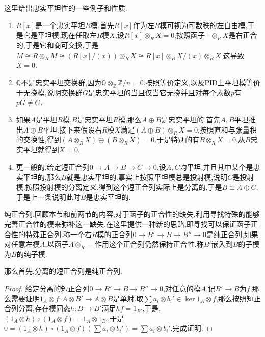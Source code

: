 这里给出忠实平坦性的一些例子和性质.
\begin{enumerate}
	\item $R[x]$是一个忠实平坦$R$模.首先$R[x]$作为左$R$模可视为可数秩的左自由模,于是它是平坦模.现在任取左$R$模$X$,设$R[x]\otimes_RX=0$.按照函子$-\otimes_RX$是右正合的,于是它和商可交换,于是$M\cong R\otimes_RM\cong(R[x]/(x))\otimes_RX\cong R[x]\otimes_RX/(x)\otimes_RX$.这导致$X=0$.
	\item $\mathbb{Q}$不是忠实平坦交换群,因为$\mathbb{Q}\otimes_{\mathbb{Z}}\mathbb{Z}/n=0$.按照等价定义,以及PID上平坦模等价于无挠模,说明交换群$G$是忠实平坦的当且仅当它无挠并且对每个素数$p$有$pG\not=G$.
	\item 如果$A$是平坦$R$模,$B$是忠实平坦$R$模,那么$A\oplus B$是忠实平坦的.首先$A,B$平坦推出$A\oplus B$平坦.接下来假设右$R$模$X$满足$(A\oplus B)\otimes_RX=0$,按照直和与张量积的交换性,得到$(A\otimes_RX)\oplus(B\otimes_RX)=0$.于是特别的有$B\otimes_RX=0$,从$B$忠实平坦就得到$X=0$.
	\item 更一般的,给定短正合列$0\to A\to B\to C\to0$,设$A,C$均平坦,并且其中某个是忠实平坦的,那么$B$就是忠实平坦的.事实上按照平坦模总是投射模,说明$C$是投射模.按照投射模的分离定义,得到这个短正合列实际上是分离的,于是$B\cong A\oplus C$,于是上一条说明此时$B$是忠实平坦的.
\end{enumerate}

纯正合列.回顾本节和前两节的内容,对于函子的正合性的缺失,利用寻找特殊的能够完善正合性的模来弥补这一缺失.在这里提供一种新的思路,即寻找可以保证函子正合性的特殊正合列.称一个右$R$模的正合列$0\to B'\to B\to B''\to0$是纯正合列,如果对任意左模$A$,以函子$A\otimes_R-$作用这个正合列仍然保持正合性.称$B'$嵌入到$B$的子模为$B$的纯子模.

那么首先,分离的短正合列是纯正合列.
\begin{proof}
	
	给定分离的短正合列$0\to B'\to B\to B''\to0$,对任意的模$A$,记$B'\to B$为$f$,那么需要证明$1_A\otimes f:A\otimes B'\to A\otimes B$是单射.取$\sum a_i\otimes b_i'\in\ker 1_A\otimes f$,那么按照短正合列分离,存在模同态$h:B\to B'$满足$hf=1_{B'}$,于是,$(1_A\otimes h)\circ(1_A\otimes f)=1_A\otimes 1_{B'}$,于是$0=(1_A\otimes h)\circ(1_A\otimes f)(\sum a_i\otimes b_i')=\sum a_i\otimes b_i'$,完成证明.
\end{proof}

